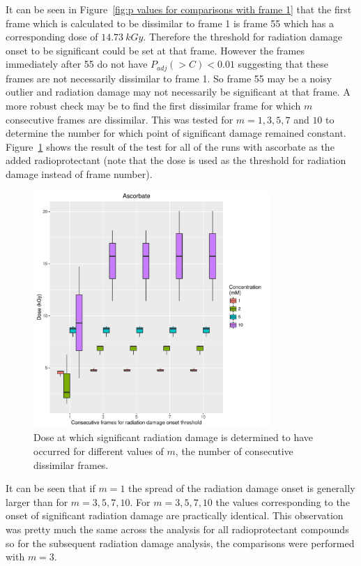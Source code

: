 It can be seen in Figure~\ref{fig:p values for comparisons with frame 1} that the first frame which is calculated to be dissimilar to frame 1 is frame 55 which has a corresponding dose of $14.73\ kGy$.
Therefore the threshold for radiation damage onset to be significant could be set at that frame.
However the frames immediately after 55 do not have $P_{adj}(>C) < 0.01$ suggesting that these frames are not necessarily dissimilar to frame 1.
So frame 55 may be a noisy outlier and radiation damage may not necessarily be significant at that frame.
A more robust check may be to find the first dissimilar frame for which $m$ consecutive frames are dissimilar.
This was tested for $m = 1, 3, 5, 7$ and $10$ to determine the number for which point of significant damage remained constant.
Figure~\ref{fig:Num consecutive frame test} shows the result of the test for all of the runs with ascorbate as the added radioprotectant (note that the dose is used as the threshold for radiation damage instead of frame number).
\begin{figure}
    \centering
    \includegraphics[width=0.8\textwidth]{figures/saxs/Ascorbate_Num_consec_fr_comp.pdf}
    \caption{Dose at which significant radiation damage is determined to have occurred for different values of $m$, the number of consecutive dissimilar frames.}
    \label{fig:Num consecutive frame test}
\end{figure}
It can be seen that if $m=1$ the spread of the radiation damage onset is generally larger than for $m=3, 5, 7, 10$.
For $m=3, 5, 7, 10$ the values corresponding to the onset of significant radiation damage are practically identical.
This observation was pretty much the same across the analysis for all radioprotectant compounds so for the subsequent radiation damage analysis, the comparisons were performed with $m = 3$.

